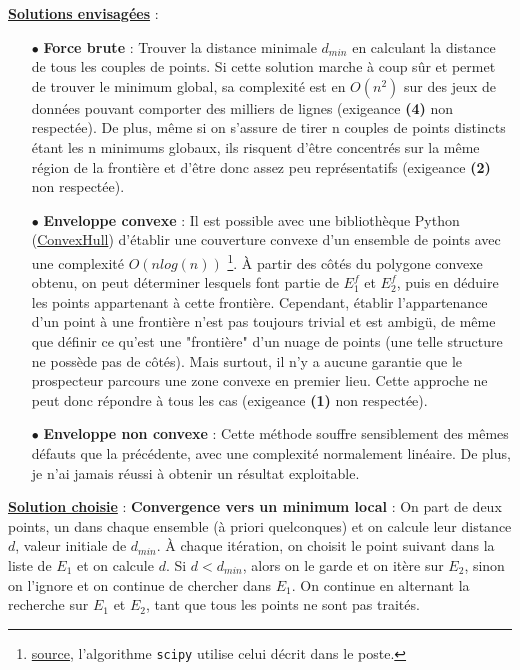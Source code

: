 \documentclass[12pt]{article}
\begin{document}
\newpage
    \noindent\textbf{\underline{Solutions envisagées}} :
    \begin{enumerate}
        \item[$\bullet$] \textbf{Force brute} : Trouver la distance minimale $d_{min}$ en calculant la distance de tous les couples de points. Si cette solution marche à coup sûr et permet de trouver le minimum global, sa complexité est en $O(n^{2})$ sur des jeux de données pouvant comporter des milliers de lignes (exigeance \textbf{(4)} non respectée). De plus, même si on s'assure de tirer n couples de points distincts étant les n minimums globaux, ils risquent d'être concentrés sur la même région de la frontière et d'être donc assez peu représentatifs (exigeance \textbf{(2)} non respectée).
        \item[$\bullet$] \textbf{Enveloppe convexe} : Il est possible avec une bibliothèque Python (\href{https://docs.scipy.org/doc/scipy/reference/generated/scipy.spatial.ConvexHull.html}{ConvexHull}) d'établir une couverture convexe d'un ensemble de points avec une complexité $O(nlog(n))$ \footnote{\href{https://stackoverflow.com/questions/13524344/complexity-of-the-quickhull-algorithm}{source}, l'algorithme \texttt{scipy} utilise celui décrit dans le poste.}. À partir des côtés du polygone convexe obtenu, on peut déterminer lesquels font partie de $E_1^f$ et $E_2^f$, puis en déduire les points appartenant à cette frontière. Cependant, établir l'appartenance d'un point à une frontière n'est pas toujours trivial et est ambigü, de même que définir ce qu'est une "frontière" d'un nuage de points (une telle structure ne possède pas de côtés). Mais surtout, il n'y a aucune garantie que le prospecteur parcours une zone convexe en premier lieu. Cette approche ne peut donc répondre à tous les cas (exigeance \textbf{(1)} non respectée).
        \item[$\bullet$] \textbf{Enveloppe non convexe} : Cette méthode souffre sensiblement des mêmes défauts que la précédente, avec une complexité normalement linéaire. De plus, je n'ai jamais réussi à obtenir un résultat exploitable.
    \end{enumerate}
    \textbf{\underline{Solution choisie}} : \textbf{Convergence vers un minimum local} : On part de deux points, un dans chaque ensemble (à priori quelconques) et on calcule leur distance $d$, valeur initiale de $d_{min}$. À chaque itération, on choisit le point suivant dans la liste de $E_1$ et on calcule $d$. Si $d < d_{min}$, alors on le garde et on itère sur $E_2$, sinon on l'ignore et on continue de chercher dans $E_1$. On continue en alternant la recherche sur $E_1$ et $E_2$, tant que tous les points ne sont pas traités. 
\end{document}
